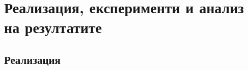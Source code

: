 \chapter{Реализация, експерименти и анализ на резултатите}

\label{Chapter4}


\section{Реализация}







